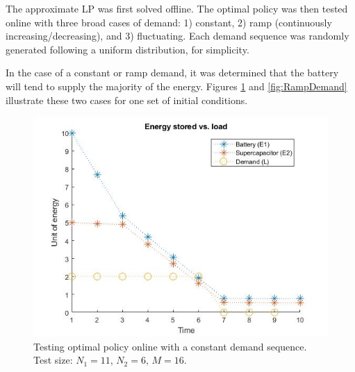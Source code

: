 \documentclass[conference]{IEEEtran}
\begin{document}
The approximate LP was first solved offline. The optimal policy was then tested online with three broad cases of demand: 1) constant, 2) ramp (continuously increasing/decreasing), and 3) fluctuating. Each demand sequence was randomly generated following a uniform distribution, for simplicity. %

In the case of a constant or ramp demand, it was determined that the battery will tend to supply the majority of the energy. Figures \ref{fig:ConstDemand} and \ref{fig:RampDemand} illustrate these two cases for one set of initial conditions.
\begin{figure}[htbp]
\centerline{\includegraphics[scale=0.35]{EnergyStoredvsload_ConstantLoad(E1_max=10,E2_max=5).jpg}}
\caption{Testing optimal policy online with a constant demand sequence. Test size: $N_{1}=11$, $N_{2}=6$, $M=16$.}
\label{fig:ConstDemand}
\end{figure}
\end{document}
